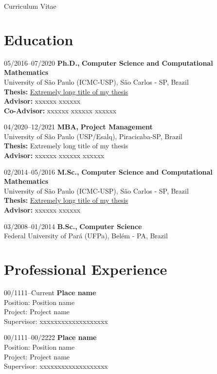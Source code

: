 \documentclass[11pt,a4paper]{article}
\begin{document}
\begin{cv}{Curriculum Vitae}
 \section{Education}
  \begin{cvlist}{}
  \item[05/2016--07/2020] 
      \textbf{Ph.D.,} {{\textbf{Computer Science and Computational Mathematics}}}\\ 
      University of São Paulo ({ICMC-USP}), São Carlos - SP, Brazil\\
      \textbf{Thesis:} \href{https://www.teses.usp.br/teses/}{Extremely long title of my thesis}\\
      \textbf{Advisor:} {xxxxxx xxxxxx}\\
      \textbf{Co-Advisor:} {xxxxxx xxxxxx xxxxxx}
  \item[04/2020--12/2021] 
      \textbf{MBA,} {{\textbf{Project Management}}}\\
      University of São Paulo ({USP/Esalq}), Piracicaba-SP, Brazil\\
      \textbf{Thesis:} Extremely long title of my thesis \\
      \textbf{Advisor:} {xxxxxx xxxxxx xxxxxx}
  \item[02/2014--05/2016] 
      \textbf{M.Sc.,} {{\textbf{Computer Science and Computational Mathematics}}}\\ 
      University of São Paulo ({ICMC-USP}), São Carlos - SP, Brazil\\
      \textbf{Thesis:} \href{http://www.teses.usp.br/teses/disponiveis/en.php}{Extremely long title of my thesis}\\
      \textbf{Advisor:} {xxxxxx xxxxxx}
  \item[03/2008--01/2014] 
      \textbf{B.Sc.,} {{\textbf{Computer Science}}}\\ 
      Federal University of Pará ({UFPa}), Belém - PA, Brazil
  \end{cvlist}
\section{Professional Experience}
  \begin{cvlist}{}
    \item[00/1111--Current]
      {\textbf{Place name}}\\
      {Position:} Position name\\
      {Project:} Project name\\
      {Supervisor:} {xxxxxxxxxxxxxxxxxxx}
    \item[00/1111--00/2222]
      {\textbf{Place name}}\\
      {Position:} Position name\\
      {Project:} Project name\\
      {Supervisor:} {xxxxxxxxxxxxxxxxxxx}
  \end{cvlist}
  

\end{cv}
\end{document}
